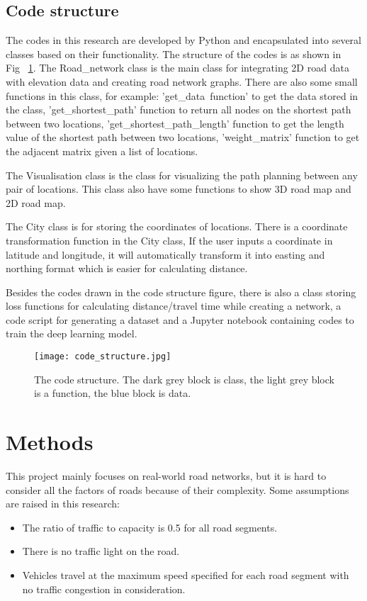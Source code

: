 \documentclass[final-report]{report-template}
\begin{document}
\subsection{Code structure}
The codes in this research are developed by Python and encapsulated into several classes based on their functionality.
The structure of the codes is as shown in Fig~ \ref{fig:code_struc}.
The Road\_network class is the main class for integrating 2D road data with elevation data and creating road network graphs.
There are also some small functions in this class, 
for example: 'get\_data\ function' to get the data stored in the class, 
'get\_shortest\_path' function to return all nodes on the shortest path between two locations,
'get\_shortest\_path\_length' function to get the length value of the shortest path between two locations,
'weight\_matrix' function to get the adjacent matrix given a list of locations. 

The Visualisation class is the class for visualizing the path planning between any pair of locations.
This class also have some functions to show 3D road map and 2D road map.

The City class is for storing the coordinates of locations. There is a coordinate transformation function in the City class, 
If the user inputs a coordinate in latitude and longitude, it will automatically transform it into easting and northing format 
which is easier for calculating distance.

Besides the codes drawn in the code structure figure, 
there is also a class storing loss functions for calculating distance/travel time while creating a network,
a code script for generating a dataset and a Jupyter notebook containing codes to train the deep learning model.
\begin{figure}[H]
    \begin{center}
        \texttt{[image: code\_structure.jpg]}
    \end{center}
    \caption{\label{fig:code_struc} The code structure. The dark grey block is class, the light grey block is a function, the blue block is data.}
\end{figure}
\section {Methods}
This project mainly focuses on real-world road networks, 
but it is hard to consider all the factors of roads because of their complexity.
Some assumptions are raised in this research:
\begin{itemize}
    \item The ratio of traffic to capacity is 0.5 for all road segments.
    \item There is no traffic light on the road.
    \item Vehicles travel at the maximum speed specified for each road segment with no traffic congestion in consideration.
\end{itemize}
\end{document}
